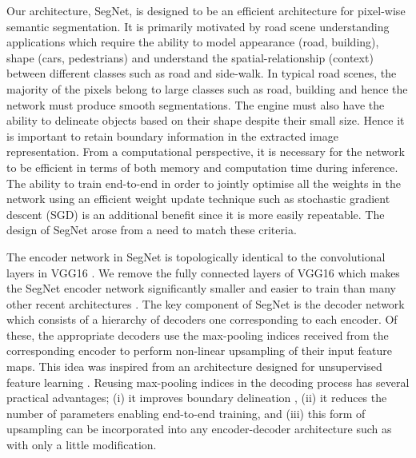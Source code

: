 \documentclass[10pt,journal,compsoc]{IEEEtran}
\begin{document}
Our architecture, SegNet, is designed to be an efficient architecture  for pixel-wise semantic segmentation. It is primarily motivated by road scene understanding applications which require the ability to model appearance (road, building), shape (cars, pedestrians) and understand the spatial-relationship (context) between different classes such as road and side-walk. In typical road scenes, the majority of the pixels belong to large classes such as road, building and hence the network must produce smooth segmentations. The engine must also have the ability to delineate objects based on their shape despite their small size. Hence it is important to retain boundary information in the extracted image representation. From a computational perspective, it is necessary for the network to be efficient in terms of both memory and computation time during inference. The ability to train end-to-end in order to jointly optimise all the weights in the network using an efficient weight update technique such as stochastic gradient descent (SGD) \cite{Bottou} is an additional benefit since it is more easily repeatable. The design of SegNet arose from a need to match these criteria.

The encoder network in SegNet is topologically identical to the convolutional layers in VGG16 \cite{simonyan2014very}. We remove the fully connected layers of VGG16 which makes the SegNet encoder network significantly smaller and easier to train than many other recent architectures \cite{FCN,noh2015learning,ParseNetRabinovich,hong2015decoupled}. The key component of SegNet is the decoder network which consists of a hierarchy of decoders one corresponding to each encoder. Of these, the appropriate decoders use the max-pooling indices received from the corresponding encoder to perform non-linear upsampling of their input feature maps. This idea was inspired from an architecture designed for unsupervised feature learning \cite{Ranzato}. Reusing max-pooling indices in the decoding process has several practical advantages; (i) it improves boundary delineation , (ii) it reduces the number of  parameters enabling end-to-end training, and (iii) this form of upsampling can be incorporated into any encoder-decoder architecture such as \cite{FCN,zheng2015conditional} with only a little modification. 
\end{document}
